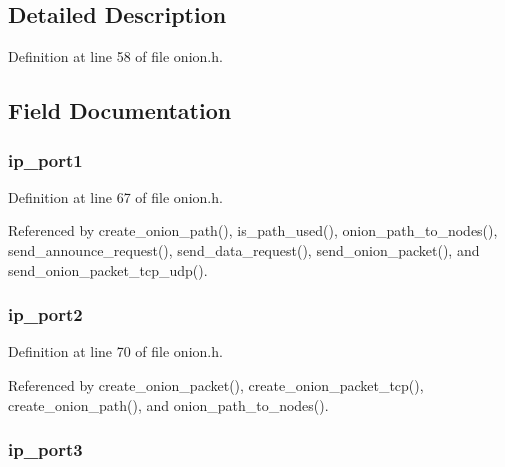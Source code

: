 \subsection{Detailed Description}


Definition at line 58 of file onion.\+h.



\subsection{Field Documentation}
\hypertarget{struct_onion___path_ad7670c0a1a9d05b2a807a9c1a7950b79}{
\subsubsection[{ip\+\_\+port1}]{ ip\+\_\+port1}}\label{struct_onion___path_ad7670c0a1a9d05b2a807a9c1a7950b79}


Definition at line 67 of file onion.\+h.



Referenced by create\+\_\+onion\+\_\+path(), is\+\_\+path\+\_\+used(), onion\+\_\+path\+\_\+to\+\_\+nodes(), send\+\_\+announce\+\_\+request(), send\+\_\+data\+\_\+request(), send\+\_\+onion\+\_\+packet(), and send\+\_\+onion\+\_\+packet\+\_\+tcp\+\_\+udp().

\hypertarget{struct_onion___path_adcf789584e4efc296bc6f915d3e2e9f9}{
\subsubsection[{ip\+\_\+port2}]{ ip\+\_\+port2}}\label{struct_onion___path_adcf789584e4efc296bc6f915d3e2e9f9}


Definition at line 70 of file onion.\+h.



Referenced by create\+\_\+onion\+\_\+packet(), create\+\_\+onion\+\_\+packet\+\_\+tcp(), create\+\_\+onion\+\_\+path(), and onion\+\_\+path\+\_\+to\+\_\+nodes().

\hypertarget{struct_onion___path_aef20a4d17084ae724f2e496f8f7a106a}{
\subsubsection[{ip\+\_\+port3}]{ ip\+\_\+port3}}\label{struct_onion___path_aef20a4d17084ae724f2e496f8f7a106a}


